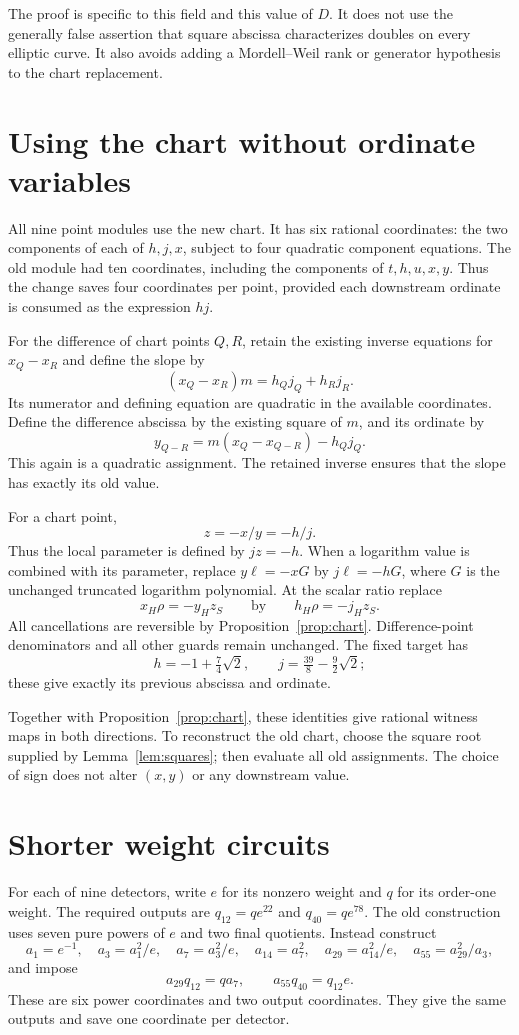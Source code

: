 \documentclass[11pt]{article}
\begin{document}
The proof is specific to this field and this value of $D$. It does not use the generally false assertion that square abscissa characterizes doubles on every elliptic curve. It also avoids adding a Mordell--Weil rank or generator hypothesis to the chart replacement.

\section{Using the chart without ordinate variables}
All nine point modules use the new chart. It has six rational coordinates: the two components of each of $h,j,x$, subject to four quadratic component equations. The old module had ten coordinates, including the components of $t,h,u,x,y$. Thus the change saves four coordinates per point, provided each downstream ordinate is consumed as the expression $hj$.

For the difference of chart points $Q,R$, retain the existing inverse equations for $x_Q-x_R$ and define the slope by
\[
 (x_Q-x_R)m=h_Qj_Q+h_Rj_R.
\]
Its numerator and defining equation are quadratic in the available coordinates. Define the difference abscissa by the existing square of $m$, and its ordinate by
\[
 y_{Q-R}=m(x_Q-x_{Q-R})-h_Qj_Q.
\]
This again is a quadratic assignment. The retained inverse ensures that the slope has exactly its old value.

For a chart point,
\[
 z=-x/y=-h/j.
\]
Thus the local parameter is defined by $jz=-h$. When a logarithm value is combined with its parameter, replace $y\ell=-xG$ by $j\ell=-hG$, where $G$ is the unchanged truncated logarithm polynomial. At the scalar ratio replace
\[
 x_H\rho=-y_Hz_S\qquad\text{by}\qquad h_H\rho=-j_Hz_S.
\]
All cancellations are reversible by Proposition~\ref{prop:chart}. Difference-point denominators and all other guards remain unchanged. The fixed target has
\[
 h=-1+\tfrac74\sqrt2,\qquad j=\tfrac{39}{8}-\tfrac92\sqrt2;
\]
these give exactly its previous abscissa and ordinate.

Together with Proposition~\ref{prop:chart}, these identities give rational witness maps in both directions. To reconstruct the old chart, choose the square root supplied by Lemma~\ref{lem:squares}; then evaluate all old assignments. The choice of sign does not alter $(x,y)$ or any downstream value.

\section{Shorter weight circuits}
For each of nine detectors, write $e$ for its nonzero weight and $q$ for its order-one weight. The required outputs are $q_{12}=qe^{22}$ and $q_{40}=qe^{78}$. The old construction uses seven pure powers of $e$ and two final quotients. Instead construct
\[
 a_1=e^{-1},\quad a_3=a_1^2/e,\quad a_7=a_3^2/e,\quad
 a_{14}=a_7^2,\quad a_{29}=a_{14}^2/e,\quad a_{55}=a_{29}^2/a_3,
\]
and impose
\[
 a_{29}q_{12}=qa_7,\qquad a_{55}q_{40}=q_{12}e.
\]
These are six power coordinates and two output coordinates. They give the same outputs and save one coordinate per detector.
\end{document}
